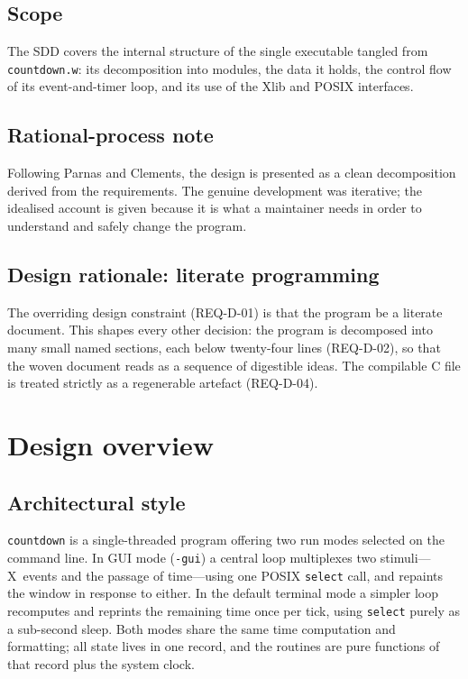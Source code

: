 \documentclass[12pt]{article}
\newcommand{\code}[1]{\texttt{#1}}
\begin{document}
\subsection{Scope}

The SDD covers the internal structure of the single executable tangled
from \code{countdown.w}: its decomposition into modules, the data it
holds, the control flow of its event-and-timer loop, and its use of the
Xlib and POSIX interfaces.

\subsection{Rational-process note}

Following Parnas and Clements, the design is presented as a clean
decomposition derived from the requirements.  The genuine development was
iterative; the idealised account is given because it is what a maintainer
needs in order to understand and safely change the program.

\subsection{Design rationale: literate programming}

The overriding design constraint (REQ-D-01) is that the program be a
literate document.  This shapes every other decision: the program is
decomposed into many small named sections, each below twenty-four lines
(REQ-D-02), so that the woven document reads as a sequence of digestible
ideas.  The compilable C file is treated strictly as a regenerable
artefact (REQ-D-04).

\section{Design overview}

\subsection{Architectural style}

\code{countdown} is a single-threaded program offering two run modes
selected on the command line.  In GUI mode (\code{-gui}) a central loop
multiplexes two stimuli---X~events and the passage of time---using one
POSIX \code{select} call, and repaints the window in response to either.
In the default terminal mode a simpler loop recomputes and reprints the
remaining time once per tick, using \code{select} purely as a sub-second
sleep.  Both modes share the same time computation and formatting; all
state lives in one record, and the routines are pure functions of that
record plus the system clock.
\end{document}
